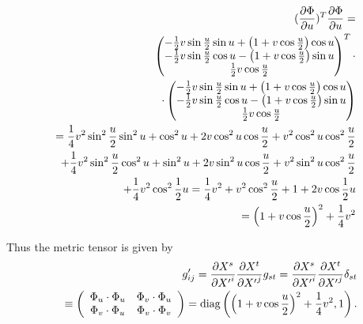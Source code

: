 {\begin{equation}
\begin{split}
(\frac{\partial \Phi }{\partial u})^{T}\frac{\partial \Phi }{\partial u}
=
\\
\begin{pmatrix}
-\frac{1}{2}v\sin \frac{u}{2}\sin u+\left( 1+v\cos \frac{u}{2}\right) \cos
u \\
-\frac{1}{2}v\sin \frac{u}{2}\cos u-\left( 1+v\cos \frac{u}{2}\right) \sin
u \\
\frac{1}{2}v\cos \frac{u}{2}
\end{pmatrix}^{T} \cdot
\\
\cdot
\begin{pmatrix}
-\frac{1}{2}v\sin \frac{u}{2}\sin u+\left( 1+v\cos \frac{u}{2}\right) \cos
u \\
-\frac{1}{2}v\sin \frac{u}{2}\cos u-\left( 1+v\cos \frac{u}{2}\right) \sin
u \\
\frac{1}{2}v\cos \frac{u}{2}
\end{pmatrix}
 \\
=
\frac{1}{4}v^{2}\sin ^{2}\frac{u}{2}\sin ^{2}u+\cos
^{2}u+2 v \cos ^{2}u \cos \frac{u}{2}+
v^{2}\cos ^{2}u  \cos ^{2}\frac{u}{2}
\\
+\frac{1}{4}v^{2}\sin ^{2}\frac{u}{2}\cos^{2}u
+\sin ^{2}u+2  v\sin ^{2}u\cos \frac{u}{2}+ v^{2} \sin^{2}u\cos ^{2}\frac{u}{2}
 \\
+\frac{1}{4}v^{2}\cos ^{2}\frac{1}{2}%
u =\allowbreak \frac{1}{4}v^{2}+v^{2}\cos ^{2}\frac{u}{2}+1+2v\cos \frac{%
1}{2}u
 \\
=\left(1+v\cos \frac{u}{2}\right)^{2}+\frac{1}{4}v^{2}
\end{split}
\end{equation}


Thus the metric tensor is given by
\begin{equation}
\begin{split}
g'_{ij}
= {\partial {X}^s\over \partial {X'}^i}{\partial {X}^t\over \partial {X'}^j}g_{st}
= {\partial {X}^s\over \partial {X'}^i}{\partial {X}^t\over \partial {X'}^j}\delta_{st}\\
\quad \equiv
\left(
\begin{array}{cc}
\Phi _{u}\cdot \Phi _{u} & \Phi _{v}\cdot \Phi _{u} \\
\Phi _{v}\cdot \Phi _{u} & \Phi _{v}\cdot \Phi _{v}
\end{array}
\right) ={\rm diag}\left(
\left(1+v\cos \frac{u}{2}\right)^{2}+\frac{1}{4}v^{2} , 1\right).
\end{split}
\end{equation}

\eexample
}





